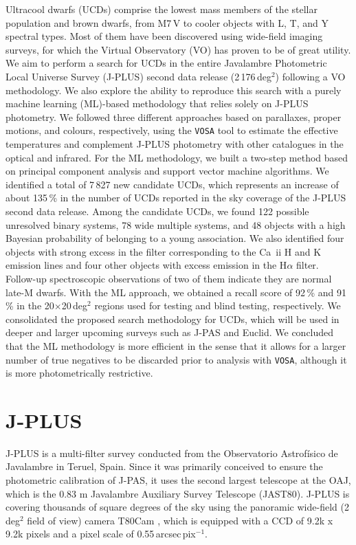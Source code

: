 Ultracool dwarfs (UCDs) comprise the lowest mass members of the stellar population and brown dwarfs, from M7\,V to cooler objects with L, T, and Y spectral types. Most of them have been discovered using wide-field imaging surveys, for which the Virtual Observatory (VO) has proven to be of great utility. We aim to perform a search for UCDs in the entire Javalambre Photometric Local Universe Survey (J-PLUS) second data release (2\,176\,deg$^2$) following a VO methodology. We also explore the ability to reproduce this search with a purely machine learning (ML)-based methodology that relies solely on J-PLUS photometry. We followed three different approaches based on parallaxes, proper motions, and colours, respectively, using the \texttt{VOSA} tool to estimate the effective temperatures and complement J-PLUS photometry with other catalogues in the optical and infrared. For the ML methodology, we built a two-step method based on principal component analysis and support vector machine algorithms. We identified a total of 7\,827 new candidate UCDs, which represents an increase of about 135\,\% in the number of UCDs reported in the sky coverage of the J-PLUS second data release. Among the candidate UCDs, we found 122 possible unresolved binary systems, 78 wide multiple systems, and 48 objects with a high Bayesian probability of belonging to a young association. We also identified four objects with strong excess in the filter corresponding to the Ca~{\sc ii} H and K emission lines and four other objects with excess emission in the H$\alpha$ filter. Follow-up spectroscopic observations of two of them indicate they are normal late-M dwarfs. With the ML approach, we obtained a recall score of 92\,\% and 91\,\% in the  20$\times$20\,deg$^2$ regions used for testing and blind testing, respectively. We consolidated the proposed search methodology for UCDs, which will be used in deeper and larger upcoming surveys such as J-PAS and Euclid. We concluded that the ML methodology is more efficient in the sense that it allows for a larger number of true negatives to be discarded prior to analysis with \texttt{VOSA}, although it is more photometrically restrictive.



\section{J-PLUS} \label{jplus_intro}

J-PLUS is a multi-filter survey conducted from the Observatorio Astrofísico de Javalambre \citep[OAJ;][]{OAJ} in Teruel, Spain. Since it was primarily conceived to ensure the photometric calibration of J-PAS, it uses the second largest telescope at the OAJ, which is the 0.83 m Javalambre Auxiliary Survey Telescope (JAST80). J-PLUS is covering thousands of square degrees of the sky using the panoramic wide-field (2\,deg$^2$ field of view) camera T80Cam \citep{t80cam}, which is equipped with a CCD of 9.2k x 9.2k pixels and a pixel scale of 0.55\,arcsec\,pix$^{-1}$.

